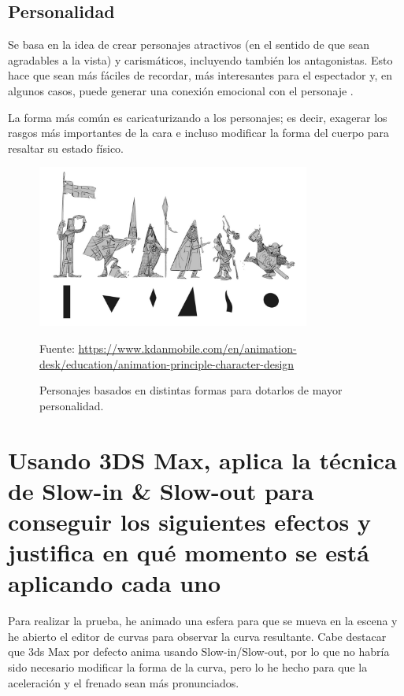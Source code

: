 \documentclass{article}
\begin{document}
\subsection{Personalidad}

Se basa en la idea de crear personajes atractivos (en el sentido de que sean agradables a la vista) y carismáticos, incluyendo también los antagonistas. Esto hace que sean más fáciles de recordar, más interesantes para el espectador y, en algunos casos, puede generar una conexión emocional con el personaje \cite{idearocket}.

\bigskip

La forma más común es caricaturizando a los personajes; es decir, exagerar los rasgos más importantes de la cara e incluso modificar la forma del cuerpo para resaltar su estado físico.


\begin{figure}[H]
    \centering
    \includegraphics[width=0.8\textwidth]{imagenes/appeal.jpg}
    \caption{Personajes basados en distintas formas para dotarlos de mayor personalidad.}
    \vspace{10pt}
    \footnotesize{Fuente: \url{https://www.kdanmobile.com/en/animation-desk/education/animation-principle-character-design}}
\end{figure}

\section{Usando 3DS Max, aplica la técnica de Slow-in \& Slow-out para conseguir los siguientes efectos y justifica en qué momento se está aplicando cada uno}

Para realizar la prueba, he animado una esfera para que se mueva en la escena y he abierto el editor de curvas para observar la curva resultante. Cabe destacar que 3ds Max por defecto anima usando Slow-in/Slow-out, por lo que no habría sido necesario modificar la forma de la curva, pero lo he hecho para que la aceleración y el frenado sean más pronunciados.
\end{document}
